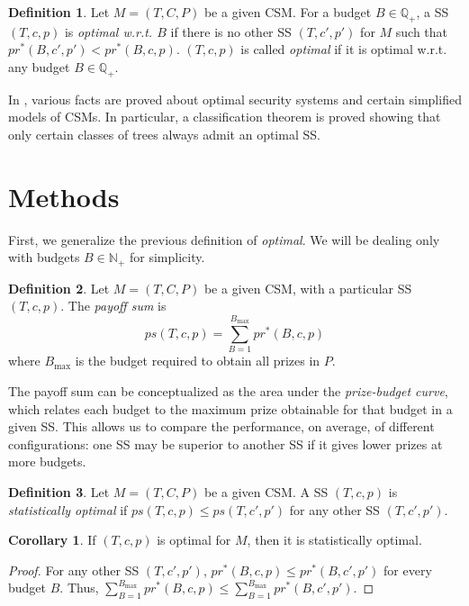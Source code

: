 \documentclass[a4paper]{amsproc}
\theoremstyle{plain}
\theoremstyle{named}
\theoremstyle{definition}
\newtheorem{definition}{Definition}
\newtheorem{corollary}{Corollary}
\newcommand{\N} {\mathbb{N}}
\newcommand{\Q} {\mathbb{Q}}
\begin{document}
\begin{definition} Let $M=(T,C,P)$ be a given CSM. For a budget $B\in\Q_+$, a SS $(T,c,p)$ is \emph{optimal w.r.t. $B$} if there is no other SS $(T,c',p')$ for $M$ such that $pr^*(B,c',p')<pr^*(B,c,p)$. $(T,c,p)$ is called \emph{optimal} if it is optimal w.r.t. any budget $B\in\Q_+$.
\end{definition}

In \cite{agk2}, various facts are proved about optimal security systems and certain simplified models of CSMs.
In particular, a classification theorem is proved showing that only certain classes of trees always admit an optimal SS.

\section{Methods}

First, we generalize the previous definition of \emph{optimal}.
We will be dealing only with budgets $B\in\N_+$ for simplicity.

\begin{definition}Let $M=(T,C,P)$ be a given CSM, with a particular SS $(T,c,p)$.
  The \emph{payoff sum} is
  $$ps(T,c,p) = \sum_{B=1}^{B_{\max}} pr^*(B,c,p)$$
  where $B_{\max}$ is the budget required to obtain all prizes in $P$.
\end{definition}

The payoff sum can be conceptualized as the area under the \emph{prize-budget curve}, which relates each budget to the maximum prize obtainable for that budget in a given SS.
This allows us to compare the performance, on average, of different configurations:
one SS may be superior to another SS if it gives lower prizes at more budgets.

\begin{definition}Let $M=(T,C,P)$ be a given CSM. A SS $(T,c,p)$ is \emph{statistically optimal} if $ps(T,c,p)\leq ps(T,c',p')$ for any other SS $(T,c',p')$.
\end{definition}

\begin{corollary}
  If $(T,c,p)$ is optimal for $M$, then it is statistically optimal.
\end{corollary}
\begin{proof}
  For any other SS $(T,c',p')$, $pr^*(B,c,p) \leq pr^*(B,c',p')$ for every budget $B$.
  Thus, $\sum_{B=1}^{B_{\max}} pr^*(B,c,p) \leq \sum_{B=1}^{B_{\max}} pr^*(B,c',p')$.
\end{proof}
\end{document}
